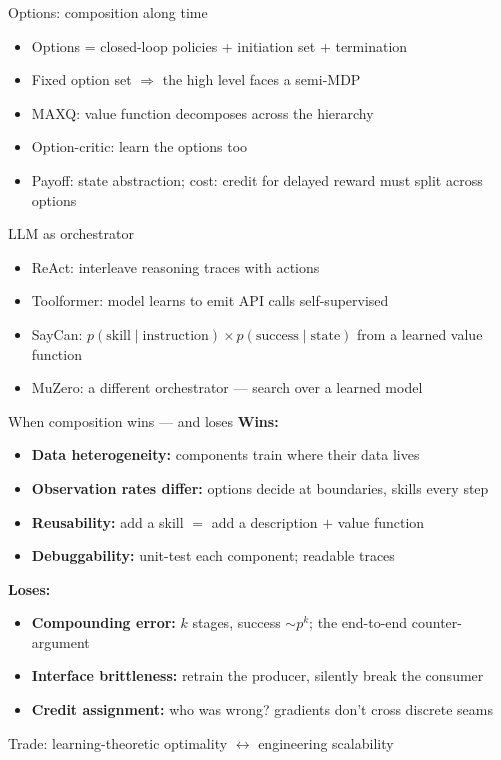 \documentclass[aspectratio=169,11pt]{beamer}
\begin{document}
\begin{frame}{Options: composition along time}
\begin{itemize}
\item Options = closed-loop policies + initiation set + termination \cite{sutton1999options}
\item Fixed option set $\Rightarrow$ the high level faces a semi-MDP
\item MAXQ: value function decomposes across the hierarchy \cite{dietterich2000maxq}
\item Option-critic: learn the options too \cite{bacon2017optioncritic}
\item Payoff: state abstraction; cost: credit for delayed reward must split across options
\end{itemize}
\end{frame}

\begin{frame}{LLM as orchestrator}
\begin{itemize}
\item ReAct: interleave reasoning traces with actions \cite{yao2023react}
\item Toolformer: model learns to emit API calls self-supervised \cite{schick2023toolformer}
\item SayCan: $p(\text{skill}\mid\text{instruction}) \times p(\text{success}\mid\text{state})$ from a learned value function \cite{ahn2022saycan}
\item MuZero: a different orchestrator --- search over a learned model \cite{schrittwieser2020muzero}
\end{itemize}
\end{frame}

\begin{frame}{When composition wins --- and loses}
\textbf{Wins:}
\begin{itemize}
\item \textbf{Data heterogeneity:} components train where their data lives
\item \textbf{Observation rates differ:} options decide at boundaries, skills every step
\item \textbf{Reusability:} add a skill $=$ add a description $+$ value function \cite{ahn2022saycan}
\item \textbf{Debuggability:} unit-test each component; readable traces \cite{yao2023react}
\end{itemize}

\textbf{Loses:}
\begin{itemize}
\item \textbf{Compounding error:} $k$ stages, success $\sim p^k$; the end-to-end counter-argument \cite{levine2016end}
\item \textbf{Interface brittleness:} retrain the producer, silently break the consumer
\item \textbf{Credit assignment:} who was wrong? gradients don't cross discrete seams
\end{itemize}

Trade: learning-theoretic optimality $\leftrightarrow$ engineering scalability
\end{frame}
\end{document}
